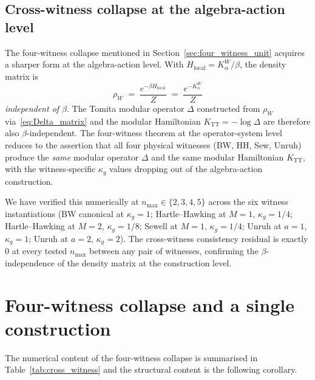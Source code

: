 \documentclass[11pt,a4paper]{article}
\theoremstyle{plain}
\theoremstyle{definition}
\newcommand{\nmax}{n_{\max}}
\newcommand{\TT}{\mathrm{TT}}
\begin{document}
\subsection{Cross-witness collapse at the algebra-action level}
\label{sec:cross_witness_algebra}

The four-witness collapse mentioned in
Section~\ref{sec:four_witness_unit} acquires a sharper form at the
algebra-action level. With $H_{\mathrm{local}} = K_\alpha^W / \beta$,
the density matrix is
\begin{equation}\label{eq:rho_W_beta_indep}
   \rho_W \;=\; \frac{e^{-\beta H_{\mathrm{local}}}}{Z}
            \;=\; \frac{e^{-K_\alpha^W}}{Z}
\end{equation}
\emph{independent of $\beta$}. The Tomita modular operator $\Delta$
constructed from $\rho_W$ via~\eqref{eq:Delta_matrix} and the modular
Hamiltonian $K_{\TT} = -\log \Delta$ are therefore also
$\beta$-independent. The four-witness theorem at the operator-system
level reduces to the assertion that all four physical witnesses
(BW, HH, Sew, Unruh) produce the \emph{same} modular operator
$\Delta$ and the same modular Hamiltonian $K_{\TT}$, with the
witness-specific $\kappa_g$ values dropping out of the algebra-action
construction.

We have verified this numerically at $\nmax \in \{2, 3, 4, 5\}$ across
the six witness instantiations (BW canonical at $\kappa_g = 1$;
Hartle--Hawking at $M = 1$, $\kappa_g = 1/4$; Hartle--Hawking at
$M = 2$, $\kappa_g = 1/8$; Sewell at $M = 1$, $\kappa_g = 1/4$;
Unruh at $a = 1$, $\kappa_g = 1$; Unruh at $a = 2$, $\kappa_g = 2$).
The cross-witness consistency residual is exactly $0$ at every tested
$\nmax$ between any pair of witnesses, confirming the
$\beta$-independence of the density matrix at the construction level.

\section{Four-witness collapse and a single construction}
\label{sec:four_witness_collapse}

The numerical content of the four-witness collapse is summarised in
Table~\ref{tab:cross_witness} and the structural content is the
following corollary.
\end{document}
